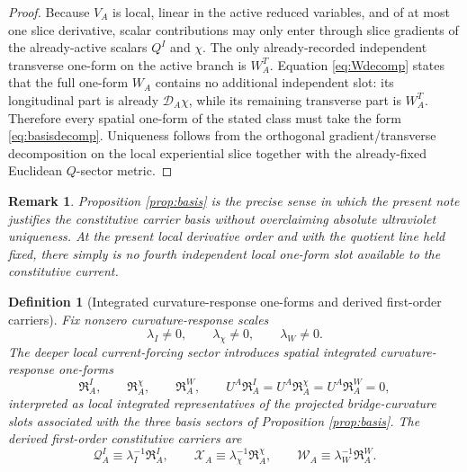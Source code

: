 \documentclass[11pt]{article}
\newcommand{\SpatialD}{\mathcal D}
\newcommand{\QCarrier}{\mathcal Q}
\newcommand{\ChiCarrier}{\mathcal X}
\newcommand{\TransCarrier}{\mathcal W}
\newtheorem{definition}{Definition}
\newtheorem{remark}{Remark}
\begin{document}
\begin{proof}
Because \(V_A\) is local, linear in the active reduced variables, and of at most one slice derivative, scalar contributions may only enter through slice gradients of the already-active scalars \(Q^I\) and \(\chi\). The only already-recorded independent transverse one-form on the active branch is \(W_A^T\). Equation \eqref{eq:Wdecomp} states that the full one-form \(W_A\) contains no additional independent slot: its longitudinal part is already \(\SpatialD_A\chi\), while its remaining transverse part is \(W_A^T\). Therefore every spatial one-form of the stated class must take the form \eqref{eq:basisdecomp}. Uniqueness follows from the orthogonal gradient/transverse decomposition on the local experiential slice together with the already-fixed Euclidean \(Q\)-sector metric.
\end{proof}

\begin{remark}
Proposition \ref{prop:basis} is the precise sense in which the present note \emph{justifies} the constitutive carrier basis without overclaiming absolute ultraviolet uniqueness. At the present local derivative order and with the quotient line held fixed, there simply is no fourth independent local one-form slot available to the constitutive current.
\end{remark}

\begin{definition}[Integrated curvature-response one-forms and derived first-order carriers]
\label{def:curvfields}
Fix nonzero curvature-response scales
\begin{equation}
\lambda_I\neq 0,
\qquad
\lambda_\chi\neq 0,
\qquad
\lambda_W\neq 0.
\label{eq:lambdas}
\end{equation}
The deeper local current-forcing sector introduces spatial integrated curvature-response one-forms
\begin{equation}
\mathfrak R_A^I,
\qquad
\mathfrak R_A^\chi,
\qquad
\mathfrak R_A^W,
\qquad
U^A\mathfrak R_A^I=U^A\mathfrak R_A^\chi=U^A\mathfrak R_A^W=0,
\label{eq:Rspatial}
\end{equation}
interpreted as local integrated representatives of the projected bridge-curvature slots associated with the three basis sectors of Proposition \ref{prop:basis}. The derived first-order constitutive carriers are
\begin{equation}
\QCarrier_A^I\equiv \lambda_I^{-1}\mathfrak R_A^I,
\qquad
\ChiCarrier_A\equiv \lambda_\chi^{-1}\mathfrak R_A^\chi,
\qquad
\TransCarrier_A\equiv \lambda_W^{-1}\mathfrak R_A^W.
\label{eq:derivedcarriersdef}
\end{equation}
\end{definition}
\end{document}
